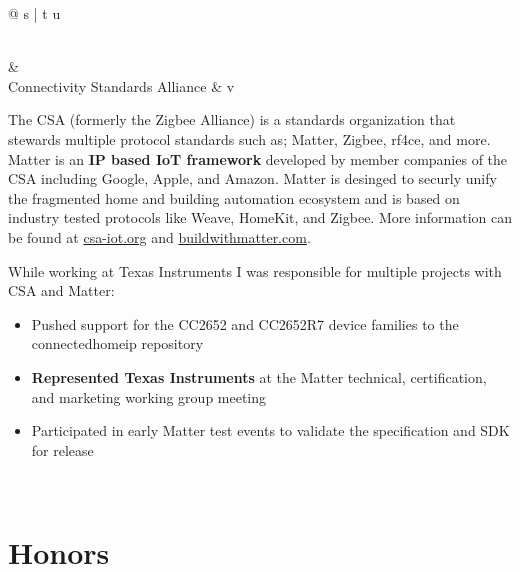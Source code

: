 \documentclass[a4paper,10pt]{article}
\begin{document}
\begin{tabular*}{\textwidth}{@{\extracolsep{\fill}} s | t u}
{\begin{itemize}[nosep, leftmargin=1em]
    \end{itemize}\vspace*{-\baselineskip}\leavevmode
  }                                                                                               \\

   &                                                    \\

  Connectivity Standards Alliance &  {v} {
    The CSA (formerly the Zigbee Alliance) is a standards organization that stewards multiple
    protocol standards such as; Matter, Zigbee, rf4ce, and more. Matter is an \textbf{IP based IoT
    framework} developed by member companies of the CSA including Google, Apple, and Amazon.  Matter
    is desinged to securly unify the fragmented home and building automation ecosystem and is based
    on industry tested protocols like Weave, HomeKit, and Zigbee. More information can be found at
    \href{https://csa-iot.org/}{csa-iot.org} and
    \href{https://buildwithmatter.com/}{buildwithmatter.com}.

    While working at Texas Instruments I was responsible for multiple projects with CSA and Matter:

    \begin{itemize}[nosep, leftmargin=1em]

      \item Pushed support for the CC2652 and CC2652R7 device families to the connectedhomeip
            repository
      \item \textbf{Represented Texas Instruments} at the Matter technical,
            certification, and marketing working group meeting
      \item Participated in early Matter test events to validate the specification and SDK for
            release

    \end{itemize}\vspace*{-\baselineskip}\leavevmode
  }                                                                                               \\

\end{tabular*}

\section{Honors}
\end{document}

